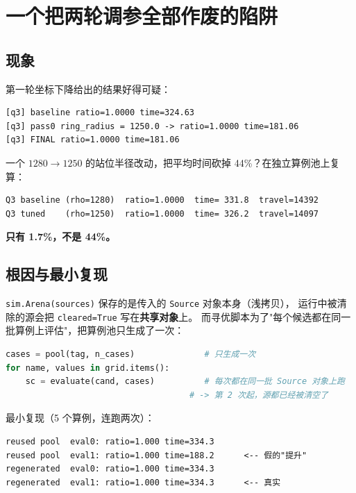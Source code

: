 \section{一个把两轮调参全部作废的陷阱}

\subsection{现象}

第一轮坐标下降给出的结果好得可疑：

\begin{lstlisting}[caption={第一轮寻优输出（有问题）}]
[q3] baseline ratio=1.0000 time=324.63
[q3] pass0 ring_radius = 1250.0 -> ratio=1.0000 time=181.06
[q3] FINAL ratio=1.0000 time=181.06
\end{lstlisting}

一个 $1280\to1250$ 的站位半径改动，把平均时间砍掉 44\%？在独立算例池上复算：

\begin{lstlisting}[caption={独立池（种子 31000--31039）复算}]
Q3 baseline (rho=1280)  ratio=1.0000  time= 331.8  travel=14392
Q3 tuned    (rho=1250)  ratio=1.0000  time= 326.2  travel=14097
\end{lstlisting}

\textbf{只有 1.7\%，不是 44\%。}

\subsection{根因与最小复现}

\texttt{sim.Arena(sources)} 保存的是传入的 \texttt{Source} 对象本身（浅拷贝），
运行中被清除的源会把 \texttt{cleared=True} 写在\textbf{共享对象}上。
而寻优脚本为了"每个候选都在同一批算例上评估"，把算例池只生成了一次：

\begin{lstlisting}[language=Python,caption={缺陷写法}]
cases = pool(tag, n_cases)              # 只生成一次
for name, values in grid.items():
    sc = evaluate(cand, cases)          # 每次都在同一批 Source 对象上跑
                                     # -> 第 2 次起，源都已经被清空了
\end{lstlisting}

最小复现（5 个算例，连跑两次）：

\begin{lstlisting}[caption={复用池 vs 重新生成}]
reused pool  eval0: ratio=1.000 time=334.3
reused pool  eval1: ratio=1.000 time=188.2      <-- 假的"提升"
regenerated  eval0: ratio=1.000 time=334.3
regenerated  eval1: ratio=1.000 time=334.3      <-- 真实
\end{lstlisting}

